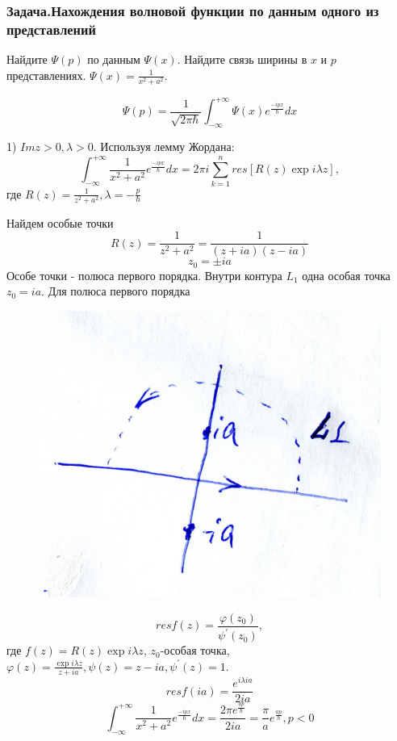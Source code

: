 \subsubsection{Задача.Нахождения волновой функции по данным одного из представлений}

Найдите $\Psi(p)$ по данным $\Psi(x)$. Найдите связь ширины в $x$ и $p$ представлениях. $\Psi(x)=\frac{1}{x^2+a^2}$.


$$\Psi(p)=\frac{1}{\sqrt{2\pi \hbar}} \int_{-\infty}^{+\infty} \Psi(x) e^{\frac{-ipx}{\hbar}}dx$$

1) $Im z>0, \lambda >0$. Используя лемму Жордана:
$$\int_{-\infty}^{+\infty} \frac{1}{x^2+a^2} e^{\frac{-ipx}{\hbar}}dx=2\pi i \sum_{k=1}^n res [R(z)\exp{i \lambda z}],$$
где $R(z)=\frac{1}{z^2+a^2}, \lambda=-\frac{p}{\hbar}$ 

Найдем особые точки 
$$R(z)= \frac{1}{z^2+a^2} = \frac{1}{(z+ia)(z-ia)}$$
$$z_0=\pm ia$$
Особе точки - полюса первого порядка. Внутри контура $L_1$ одна особая точка $z_0=ia$. Для полюса первого порядка

\begin{figure}
\includegraphics[width=\linewidth]{fig/fig83}
\caption{}
\vspace{-17pt}
\end{figure}

$$res f(z) = \frac{\varphi(z_0)}{\psi^{'}(z_0)},$$
где $f(z)=R(z)\exp{i \lambda z}$, $z_0$-особая точка, $\varphi(z)=\frac{\exp{i \lambda z}}{z+ia}, \psi(z)=z-ia, \psi^{'}(z)=1$.
$$res f(ia) = \frac{e^{i \lambda i a}}{2ia}$$
$$\int_{-\infty}^{+\infty} \frac{1}{x^2+a^2} e^{\frac{-ipx}{\hbar}}dx=\frac{2\pi e^{\frac{ap}{\hbar}}}{2ia}=\frac{\pi}{a} e^{\frac{ap}{\hbar}}, p<0$$

